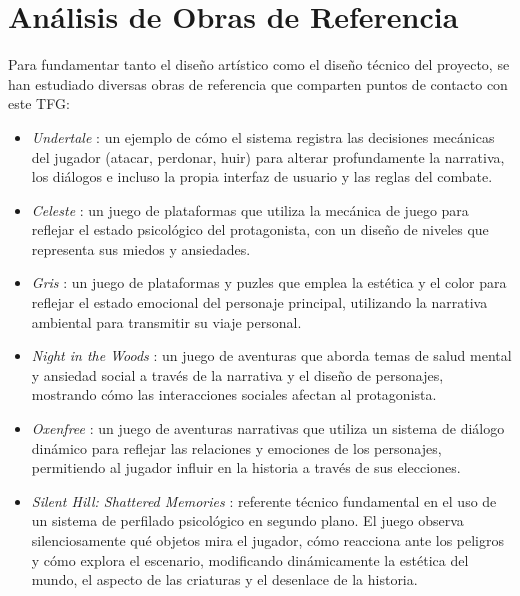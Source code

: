 \section{Análisis de Obras de Referencia}
Para fundamentar tanto el diseño artístico como el diseño técnico del proyecto, se han estudiado diversas obras de referencia que comparten puntos de contacto con este TFG:
\begin{itemize}
  \item \textit{Undertale} \parencite{fox2015}: un ejemplo de cómo el sistema registra las decisiones mecánicas del jugador (atacar, perdonar, huir) para alterar profundamente la narrativa, los diálogos e incluso la propia interfaz de usuario y las reglas del combate.
  \item \textit{Celeste} \parencite{maddy2018}: un juego de plataformas que utiliza la mecánica de juego para reflejar el estado psicológico del protagonista, con un diseño de niveles que representa sus miedos y ansiedades.
  \item \textit{Gris} \parencite{nomada2018}: un juego de plataformas y puzles que emplea la estética y el color para reflejar el estado emocional del personaje principal, utilizando la narrativa ambiental para transmitir su viaje personal.
  \item \textit{Night in the Woods} \parencite{infinitefall2017}: un juego de aventuras que aborda temas de salud mental y ansiedad social a través de la narrativa y el diseño de personajes, mostrando cómo las interacciones sociales afectan al protagonista.
  \item \textit{Oxenfree} \parencite{nightschool2016}: un juego de aventuras narrativas que utiliza un sistema de diálogo dinámico para reflejar las relaciones y emociones de los personajes, permitiendo al jugador influir en la historia a través de sus elecciones.
  \item \textit{Silent Hill: Shattered Memories} \parencite{climax2009}: referente técnico fundamental en el uso de un sistema de perfilado psicológico en segundo plano. El juego observa silenciosamente qué objetos mira el jugador, cómo reacciona ante los peligros y cómo explora el escenario, modificando dinámicamente la estética del mundo, el aspecto de las criaturas y el desenlace de la historia.
\end{itemize}

